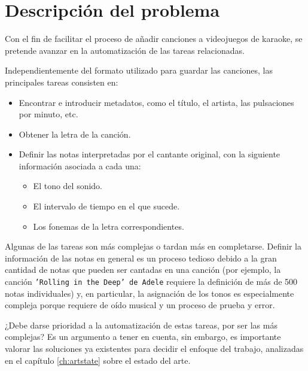 \chapter{Descripción del problema}

Con el fin de facilitar el proceso de añadir canciones a videojuegos de karaoke, se pretende avanzar en la automatización de las tareas relacionadas.

Independientemente del formato utilizado para guardar las canciones, las principales tareas consisten en:

\begin{itemize}
	\item{Encontrar e introducir metadatos, como el título, el artista, las pulsaciones por minuto, etc.}
	\item{Obtener la letra de la canción.}
	\item{Definir las notas interpretadas por el cantante original, con la siguiente información asociada a cada una:}
	\begin{itemize}
		\item{El tono del sonido.}
		\item{El intervalo de tiempo en el que sucede.}
		\item{Los fonemas de la letra correspondientes.}
	\end{itemize}
\end{itemize}

Algunas de las tareas son más complejas o tardan más en completarse. Definir la información de las notas en general es un proceso tedioso debido a la gran cantidad de notas que pueden ser cantadas en una canción (por ejemplo, la canción \texttt{'Rolling in the Deep' de Adele} requiere la definición de más de 500 notas individuales) y, en particular, la asignación de los tonos es especialmente compleja porque requiere de oído musical y un proceso de prueba y error.

¿Debe darse prioridad a la automatización de estas tareas, por ser las más complejas? Es un argumento a tener en cuenta, sin embargo, es importante valorar las soluciones ya existentes para decidir el enfoque del trabajo, analizadas en el capítulo \ref{ch:artstate} sobre el estado del arte.